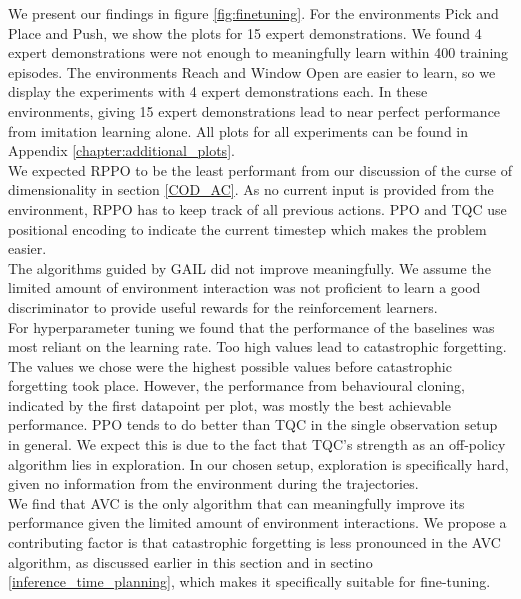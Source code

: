We present our findings in figure \ref{fig:finetuning}. 
For the environments Pick and Place and Push, we show the plots for 15 expert demonstrations. We found 4 expert demonstrations were not 
enough to meaningfully learn within 400 training episodes. The environments Reach and Window Open are easier to learn, so we display the 
experiments with 4 expert demonstrations each. In these environments, giving 15 expert demonstrations lead to near perfect performance from imitation learning alone. 
All plots for all experiments can be found in Appendix \ref{chapter:additional_plots}.\\

We expected RPPO to be the least performant from our discussion of the curse of dimensionality in section \ref{COD_AC}. As no current input 
is provided from the environment, RPPO has to keep track of all previous actions. PPO and TQC use positional encoding to indicate the current 
timestep which makes the problem easier.\\ 

The algorithms guided by GAIL did not improve meaningfully. We assume the limited amount of environment 
interaction was not proficient to learn a good discriminator to provide useful rewards for the reinforcement learners.\\ 

For hyperparameter tuning we found that the performance of the baselines was most 
reliant on the learning rate. Too high values lead to catastrophic forgetting. The values we chose were the highest possible values before 
catastrophic forgetting took place. However, the performance from behavioural cloning, indicated by the first datapoint per plot, was mostly 
the best achievable performance. PPO tends to do better than TQC in the single observation setup in general. We expect this is due to the 
fact that TQC's strength as an off-policy algorithm lies in exploration. In our chosen setup, exploration is specifically hard, given no 
information from the environment during the trajectories.\\

We find that AVC is the only algorithm that can meaningfully improve its performance given the limited amount of environment interactions. 
We propose a contributing factor is that catastrophic forgetting is less pronounced in the AVC algorithm, as discussed earlier in this section and in sectino \ref{inference_time_planning}, 
which makes it specifically suitable for fine-tuning.



